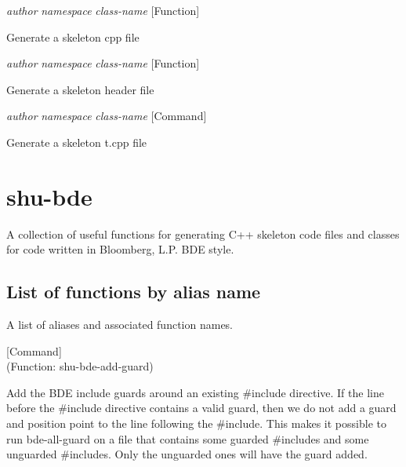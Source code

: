 \vspace{1em}
\noindent
{}
\usebox{\funcname}\emph{author} \emph{namespace} \emph{class-name}
 \hfill [Function]

\begin{doc-string}
Generate a skeleton cpp file
\end{doc-string}

\vspace{1em}
\noindent
{}
\usebox{\funcname}\emph{author} \emph{namespace} \emph{class-name}
 \hfill [Function]

\begin{doc-string}
Generate a skeleton header file
\end{doc-string}

\vspace{1em}
\noindent
{}
\usebox{\funcname}\emph{author} \emph{namespace} \emph{class-name}
 \hfill [Command]

\begin{doc-string}
Generate a skeleton t.cpp file
\end{doc-string}

\section{shu-bde}


A collection of useful functions for generating C++ skeleton code files
and classes for code written in Bloomberg, L.P. BDE style.


\subsection{List of functions by alias name}

A list of aliases and associated function names.



\vspace{1em}
\noindent
{}
\usebox{\funcname}
 \hfill [Command]\\%
 (Function: shu-bde-add-guard)

\begin{doc-string}
Add the BDE include guards around an existing \#include directive.  If the line
before the \#include directive contains a valid guard, then we do not add a guard
and position point to the line following the \#include.  This makes it possible to
run bde-all-guard on a file that contains some guarded \#includes and some unguarded
\#includes.  Only the unguarded ones will have the guard added.
\end{doc-string}

